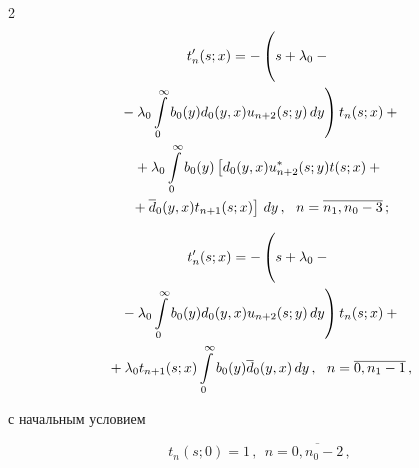\begin{multicols}{2}
\begin{multline*}
t'_n(s;x) = -\left( \vphantom{\int\limits_0^\infty}


s + \lambda_0 - {}\right.\\


\left.{}-\lambda_0 \int\limits_0^\infty b_0(y) d_0(y,x) u_{n+2}(s;y) \, dy


\right)


t_n(s;x) +{}


\\


{}+


\lambda_0 \int\limits_0^\infty b_0(y) \left[d_0(y,x) u_{n+2}^*(s;y) t(s;x) +{}\right.\\


\left.{}+


\d_0(y,x) t_{n+1}(s;x)\right] \, dy\,,


\ \ n=\overline{n_1,n_0-3}\,;


\end{multline*}







\vspace*{-12pt}





\noindent


\begin{multline*}


t'_n(s;x)= - \left( \vphantom{\int\limits_0^\infty}


s + \lambda_0 - {}\right.\\


\left.{}-\lambda_0 \int\limits_0^\infty b_0(y) d_0(y,x) u_{n+2}(s;y)\, dy


\right) t_n(s;x) +{}


\\


{}+


\lambda_0 t_{n+1}(s;x) \int\limits_0^\infty b_0(y) \d_0(y,x) \, dy\,,


\ \ n=\overline{0,n_1-1}\,,


\end{multline*}




с начальным условием


$$


t_{n}(s;0)= 1\,,\ \ n=\overline{0,n_0-2}\,,


$$



\end{multicols}
